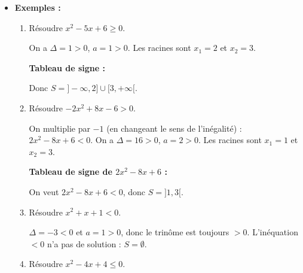 \documentclass[12pt,a4paper]{article}
\newcounter{solution}
\begin{document}
\begin{itemize}
    \item \textbf{Exemples :}
    \begin{enumerate}[label=\arabic*)]
        \item Résoudre $x^2 - 5x + 6 \geq 0$.
        
        On a $\Delta = 1 > 0$, $a = 1 > 0$. Les racines sont $x_1 = 2$ et $x_2 = 3$.
        
        \textbf{Tableau de signe :}

    \begin{center}
    \end{center}
        
        Donc $S = ]-\infty, 2] \cup [3, +\infty[$.
        
        \item Résoudre $-2x^2 + 8x - 6 > 0$.
        
        On multiplie par $-1$ (en changeant le sens de l'inégalité) : $2x^2 - 8x + 6 < 0$.
        On a $\Delta = 16 > 0$, $a = 2 > 0$. Les racines sont $x_1 = 1$ et $x_2 = 3$.
        
        \textbf{Tableau de signe de $2x^2 - 8x + 6$ :}

    \begin{center}
    \end{center}
        
        On veut $2x^2 - 8x + 6 < 0$, donc $S = ]1, 3[$.
        
        \item Résoudre $x^2 + x + 1 < 0$.
        
        $\Delta = -3 < 0$ et $a = 1 > 0$, donc le trinôme est toujours $> 0$.
        L'inéquation $< 0$ n'a pas de solution : $S = \emptyset$.
        
        \item Résoudre $x^2 - 4x + 4 \leq 0$.
        

\end{enumerate}
\end{itemize}
\end{document}

